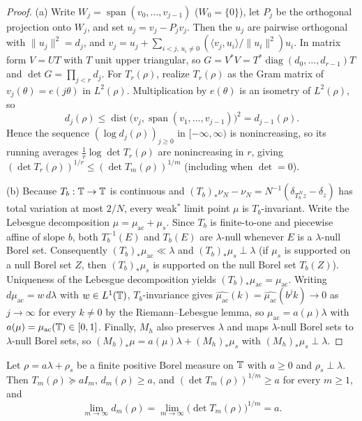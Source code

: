 \documentclass[11pt]{article}
\begin{document}
\begin{proof}
(a) Write $W_j=\operatorname{span}(v_0,\dots,v_{j-1})$ ($W_0=\{0\}$), let $P_j$ be the orthogonal projection onto $W_j$, and set $u_j=v_j-P_jv_j$. Then the $u_j$ are pairwise orthogonal with $\|u_j\|^2=d_j$, and $v_j=u_j+\sum_{i<j,\,u_i\ne0}(\langle v_j,u_i\rangle/\|u_i\|^2)u_i$. In matrix form $V=UT$ with $T$ unit upper triangular, so $G=V^*V=T^*\operatorname{diag}(d_0,\dots,d_{r-1})T$ and $\det G=\prod_{j<r}d_j$. For $T_r(\rho)$, realize $T_r(\rho)$ as the Gram matrix of $v_j(\theta)=e(j\theta)$ in $L^2(\rho)$. Multiplication by $e(\theta)$ is an isometry of $L^2(\rho)$, so
\[
d_j(\rho)\le\operatorname{dist}\bigl(v_j,\operatorname{span}(v_1,\dots,v_{j-1})\bigr)^2=d_{j-1}(\rho).
\]
Hence the sequence $(\log d_j(\rho))_{j\ge0}$ in $[-\infty,\infty)$ is nonincreasing, so its running averages $\frac1r\log\det T_r(\rho)$ are nonincreasing in $r$, giving $(\det T_r(\rho))^{1/r}\le(\det T_m(\rho))^{1/m}$ (including when $\det=0$).

(b) Because $T_b:\mathbb T\to\mathbb T$ is continuous and $(T_b)_*\nu_N-\nu_N=N^{-1}(\delta_{T_b^Nz}-\delta_z)$ has total variation at most $2/N$, every weak$^*$ limit point $\mu$ is $T_b$-invariant. Write the Lebesgue decomposition $\mu=\mu_{\mathrm{ac}}+\mu_s$. Since $T_b$ is finite-to-one and piecewise affine of slope $b$, both $T_b^{-1}(E)$ and $T_b(E)$ are $\lambda$-null whenever $E$ is a $\lambda$-null Borel set. Consequently $(T_b)_*\mu_{\mathrm{ac}}\ll\lambda$ and $(T_b)_*\mu_s\perp\lambda$ (if $\mu_s$ is supported on a null Borel set $Z$, then $(T_b)_*\mu_s$ is supported on the null Borel set $T_b(Z)$). Uniqueness of the Lebesgue decomposition yields $(T_b)_*\mu_{\mathrm{ac}}=\mu_{\mathrm{ac}}$. Writing $d\mu_{\mathrm{ac}}=w\,d\lambda$ with $w\in L^1(\mathbb T)$, $T_b$-invariance gives $\widehat{\mu_{\mathrm{ac}}}(k)=\widehat{\mu_{\mathrm{ac}}}(b^jk)\to0$ as $j\to\infty$ for every $k\ne0$ by the Riemann--Lebesgue lemma, so $\mu_{\mathrm{ac}}=a(\mu)\lambda$ with $a(\mu)=\mu_{\mathrm{ac}}(\mathbb T)\in[0,1]$. Finally, $M_h$ also preserves $\lambda$ and maps $\lambda$-null Borel sets to $\lambda$-null Borel sets, so $(M_h)_*\mu=a(\mu)\lambda+(M_h)_*\mu_s$ with $(M_h)_*\mu_s\perp\lambda$.
\end{proof}

\begin{proposition}\label{prop:const-szego}
Let $\rho=a\lambda+\rho_s$ be a finite positive Borel measure on $\mathbb T$ with $a\ge0$ and $\rho_s\perp\lambda$. Then $T_m(\rho)\succeq aI_m$, $d_m(\rho)\ge a$, and $(\det T_m(\rho))^{1/m}\ge a$ for every $m\ge1$, and
\[
\lim_{m\to\infty}d_m(\rho)=\lim_{m\to\infty}\bigl(\det T_m(\rho)\bigr)^{1/m}=a.
\]
\end{proposition}
\end{document}
